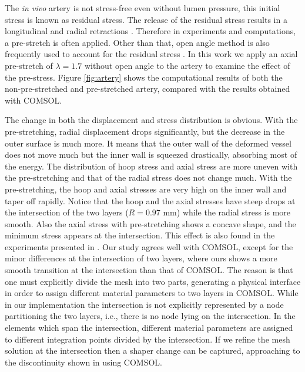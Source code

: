 The \emph{in vivo} artery is not stress-free even without lumen pressure, this initial stress is known as residual stress. The release of the residual stress results in a longitudinal and radial retractions \cite{Fung4, Holzapfel3}. Therefore in experiments and computations, a pre-stretch is often applied. Other than that, open angle method is also frequently used to account for the residual stress \cite{Kassab, Finet}. In this work we apply an axial pre-stretch of $\lambda = 1.7$ without open angle to the artery to examine the effect of the pre-stress. Figure \ref{fig:artery} shows the computational results of both the non-pre-stretched and pre-stretched artery, compared with the results obtained with COMSOL. 

The change in both the displacement and stress distribution is obvious. With the pre-stretching, radial displacement drops significantly, but the decrease in the outer surface is much more. It means that the outer wall of the deformed vessel does not move much but the inner wall is squeezed drastically, absorbing most of the energy. The distribution of hoop stress and axial stress are more uneven with the pre-stretching and that of the radial stress does not change much. With the pre-stretching, the hoop and axial stresses are very high on the inner wall and taper off rapidly. Notice that the hoop and the axial stresses have steep drops at the intersection of the two layers ($R = 0.97$ mm) while the radial stress is more smooth. Also the axial stress with pre-stretching shows a concave shape, and the minimum stress appears at the intersection. This effect is also found in the experiments presented in \cite{Keitzer}. Our study agrees well with COMSOL, except for the minor differences at the intersection of two layers, where ours shows a more smooth transition at the intersection than that of COMSOL. The reason is that one must explicitly divide the mesh into two parts, generating a physical interface in order to assign different material parameters to two layers in COMSOL. While in our implementation the intersection is not explicitly represented by a node partitioning the two layers, i.e., there is no node lying on the intersection. In the elements which span the intersection, different material parameters are assigned to different integration points divided by the intersection. If we refine the mesh solution at the intersection then a shaper change can be captured, approaching to the discontinuity shown in using COMSOL.

